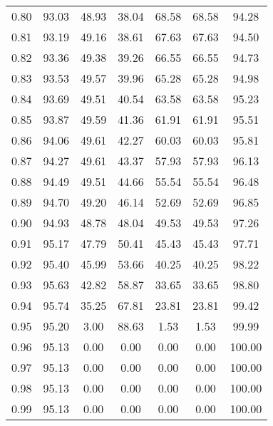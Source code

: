 \begin{tabular}{|c|c|c|c|c|c|c|}
      0.80 &     93.03 &     48.93 &      38.04 &   68.58 &      68.58 &         94.28 \\
      0.81 &     93.19 &     49.16 &      38.61 &   67.63 &      67.63 &         94.50 \\
      0.82 &     93.36 &     49.38 &      39.26 &   66.55 &      66.55 &         94.73 \\
      0.83 &     93.53 &     49.57 &      39.96 &   65.28 &      65.28 &         94.98 \\
      0.84 &     93.69 &     49.51 &      40.54 &   63.58 &      63.58 &         95.23 \\
      0.85 &     93.87 &     49.59 &      41.36 &   61.91 &      61.91 &         95.51 \\
      0.86 &     94.06 &     49.61 &      42.27 &   60.03 &      60.03 &         95.81 \\
      0.87 &     94.27 &     49.61 &      43.37 &   57.93 &      57.93 &         96.13 \\
      0.88 &     94.49 &     49.51 &      44.66 &   55.54 &      55.54 &         96.48 \\
      0.89 &     94.70 &     49.20 &      46.14 &   52.69 &      52.69 &         96.85 \\
      0.90 &     94.93 &     48.78 &      48.04 &   49.53 &      49.53 &         97.26 \\
      0.91 &     95.17 &     47.79 &      50.41 &   45.43 &      45.43 &         97.71 \\
      0.92 &     95.40 &     45.99 &      53.66 &   40.25 &      40.25 &         98.22 \\
      0.93 &     95.63 &     42.82 &      58.87 &   33.65 &      33.65 &         98.80 \\
      0.94 &     95.74 &     35.25 &      67.81 &   23.81 &      23.81 &         99.42 \\
      0.95 &     95.20 &      3.00 &      88.63 &    1.53 &       1.53 &         99.99 \\
      0.96 &     95.13 &      0.00 &       0.00 &    0.00 &       0.00 &        100.00 \\
      0.97 &     95.13 &      0.00 &       0.00 &    0.00 &       0.00 &        100.00 \\
      0.98 &     95.13 &      0.00 &       0.00 &    0.00 &       0.00 &        100.00 \\
      0.99 &     95.13 &      0.00 &       0.00 &    0.00 &       0.00 &        100.00 \\
\bottomrule
\end{tabular}

